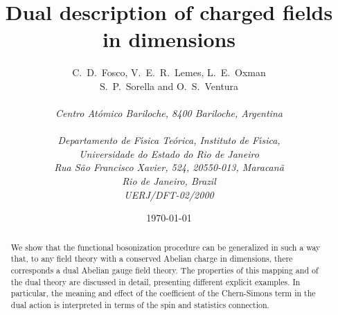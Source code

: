 \documentclass[a4paper,12pt]{article}
\begin{document}
\title{Dual description of \coordHE{} charged fields\\in {}\coordHE{}
  dimensions}
\author{C.~D.~Fosco\coordHE{}, V.~E.~R.~Lemes\coordHE{}, L.~E.~Oxman\coordHE{}\\
  S.~P.~Sorella\coordHE{} and O.~S.~Ventura\coordHE{}\\ \\
  {\normalsize\it {}\coordHE{}Centro At\' omico Bariloche, 8400 Bariloche,
    Argentina}\\ \\
  {\normalsize\it {}\coordHE{}Departamento de F\'{\i}sica Te\'{o}rica, Instituto de F\'{\i}sica,}\\
  {\normalsize\it Universidade do Estado do Rio de Janeiro}\\
  {\normalsize\it Rua S{\~a}o Francisco Xavier, 524, 20550-013, Maracan\~{a}}\\
  {\normalsize\it Rio de Janeiro, Brazil}\\
  {\normalsize\it UERJ/DFT-02/2000} }
\date{\today}
\maketitle
\begin{abstract}
  We show that the functional bosonization procedure can be
  generalized in such a way that, to any field theory with a conserved
  Abelian charge in \coordHE{} dimensions, there corresponds a dual Abelian
  gauge field theory.  The properties of this mapping and of the dual
  theory are discussed in detail, presenting different explicit
  examples. In particular, the meaning and effect of the coefficient
  of the Chern-Simons term in the dual action is interpreted in terms
  of the spin and statistics connection.
\end{abstract}
\bigskip {}
\end{document}
